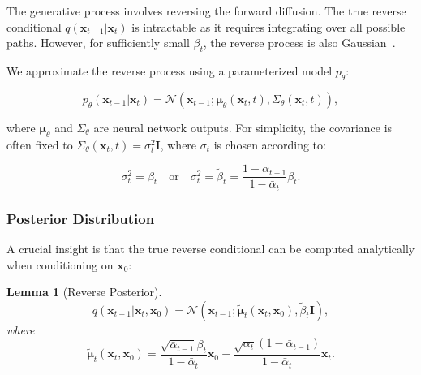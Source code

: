 \documentclass[12pt]{report}
\newtheorem{lemma}[theorem]{Lemma}
\theoremstyle{definition}
\newcommand{\N}{\mathcal{N}}
\begin{document}
The generative process involves reversing the forward diffusion. The true reverse conditional $q(\mathbf{x}_{t-1} | \mathbf{x}_t)$ is intractable as it requires integrating over all possible paths. However, for sufficiently small $\beta_t$, the reverse process is also Gaussian~\citep{feller1949theory, anderson1982reverse}.

We approximate the reverse process using a parameterized model $p_\theta$:

\begin{equation}
p_\theta(\mathbf{x}_{t-1} | \mathbf{x}_t) = \N(\mathbf{x}_{t-1}; \boldsymbol{\mu}_\theta(\mathbf{x}_t, t), \Sigma_\theta(\mathbf{x}_t, t)),
\label{eq:reverse_step}
\end{equation}

where $\boldsymbol{\mu}_\theta$ and $\Sigma_\theta$ are neural network outputs. For simplicity, the covariance is often fixed to $\Sigma_\theta(\mathbf{x}_t, t) = \sigma_t^2 \mathbf{I}$, where $\sigma_t$ is chosen according to:

\begin{equation}
\sigma_t^2 = \beta_t \quad \text{or} \quad \sigma_t^2 = \tilde{\beta}_t = \frac{1 - \bar{\alpha}_{t-1}}{1 - \bar{\alpha}_t} \beta_t.
\label{eq:variance_choices}
\end{equation}

\subsubsection{Posterior Distribution}

A crucial insight is that the true reverse conditional can be computed analytically when conditioning on $\mathbf{x}_0$:

\begin{lemma}[Reverse Posterior]
\begin{equation}
q(\mathbf{x}_{t-1} | \mathbf{x}_t, \mathbf{x}_0) = \N(\mathbf{x}_{t-1}; \tilde{\boldsymbol{\mu}}_t(\mathbf{x}_t, \mathbf{x}_0), \tilde{\beta}_t \mathbf{I}),
\label{eq:reverse_posterior}
\end{equation}
where
\begin{equation}
\tilde{\boldsymbol{\mu}}_t(\mathbf{x}_t, \mathbf{x}_0) = \frac{\sqrt{\bar{\alpha}_{t-1}} \beta_t}{1 - \bar{\alpha}_t} \mathbf{x}_0 + \frac{\sqrt{\alpha_t}(1 - \bar{\alpha}_{t-1})}{1 - \bar{\alpha}_t} \mathbf{x}_t.
\label{eq:posterior_mean}
\end{equation}
\end{lemma}
\end{document}
